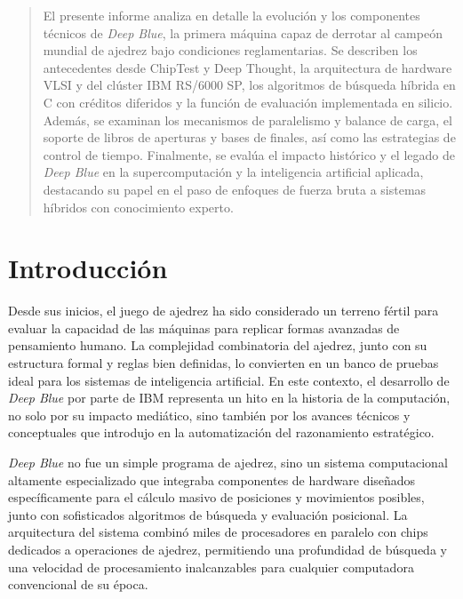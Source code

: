 \documentclass[a4paper, 12pt]{article}
\begin{document}
\begin{abstract}
    El presente informe analiza en detalle la evolución y los 
    componentes técnicos de \textit{Deep Blue}, la primera 
    máquina capaz de derrotar al campeón mundial de ajedrez 
    bajo condiciones reglamentarias. Se describen los 
    antecedentes desde ChipTest y Deep Thought, la arquitectura 
    de hardware VLSI y del clúster IBM RS/6000 SP, los 
    algoritmos de búsqueda híbrida en C con créditos diferidos y 
    la función de evaluación implementada en silicio. Además, 
    se examinan los mecanismos de paralelismo y balance de carga, 
    el soporte de libros de aperturas y bases de finales, así 
    como las estrategias de control de tiempo. Finalmente, se 
    evalúa el impacto histórico y el legado de \textit{Deep Blue} 
    en la supercomputación y la inteligencia artificial aplicada, 
    destacando su papel en el paso de enfoques de fuerza bruta a 
    sistemas híbridos con conocimiento experto.
\end{abstract}
    

\newpage
\section{Introducción}

Desde sus inicios, el juego de ajedrez ha sido considerado un 
terreno fértil para evaluar la capacidad de las máquinas para 
replicar formas avanzadas de pensamiento humano. La complejidad 
combinatoria del ajedrez, junto con su estructura formal y 
reglas bien definidas, lo convierten en un banco de pruebas 
ideal para los sistemas de inteligencia artificial. En este 
contexto, el desarrollo de \textit{Deep Blue} por parte de IBM 
representa un hito en la historia de la computación, no solo por 
su impacto mediático, sino también por los avances técnicos y 
conceptuales que introdujo en la automatización del razonamiento 
estratégico.

\textit{Deep Blue} no fue un simple programa de ajedrez, sino un 
sistema computacional altamente especializado que integraba 
componentes de hardware diseñados específicamente para el 
cálculo masivo de posiciones y movimientos posibles, junto con 
sofisticados algoritmos de búsqueda y evaluación posicional. La 
arquitectura del sistema combinó miles de procesadores en 
paralelo con chips dedicados a operaciones de ajedrez, 
permitiendo una profundidad de búsqueda y una velocidad de 
procesamiento inalcanzables para cualquier computadora 
convencional de su época.
\end{document}
